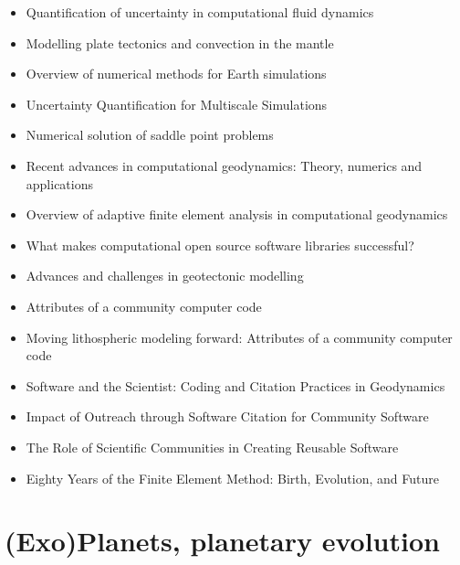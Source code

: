    \begin{itemize}
   \item [\nineteenninetyseven] Quantification of uncertainty in computational fluid dynamics \cite{roac97}
   \item [\twothousand] Modelling plate tectonics and convection in the mantle \cite{mogz00}
   \item [\twothousandone] Overview of numerical methods for Earth simulations \cite{momd01}
   \item [\twothousandtwo] Uncertainty Quantification for Multiscale Simulations \cite{degg02}
   \item [\twothousandfive] Numerical solution of saddle point problems \cite{begl05}
   \item [\twothousandeight] Recent advances in computational geodynamics: Theory, numerics and applications \cite{kags08}
   \item [\twothousandthirteen] Overview of adaptive finite element analysis in computational geodynamics \cite{masm13}
   \item [\twothousandthirteen] What makes computational open source software libraries successful? \cite{bahe13}
   \item [\twothousandfourteen] Advances and challenges in geotectonic modelling \cite{bufy14}
   \item [\twothousandfifteen] Attributes of a community computer code \cite{comc15}
   \item [\twothousandfifteen] Moving lithospheric modeling forward: Attributes of a community computer code \cite{comc15}
   \item [\twothousandseventeen] Software and the Scientist: Coding and Citation Practices in Geodynamics \cite{hwfs17}
   \item [\twothousandnineteen] Impact of Outreach through Software Citation for Community Software \cite{hwpc19}
   \item [\twothousandnineteen] The Role of Scientific Communities in Creating Reusable Software \cite{kehg19}
   \item [\twothousandtwentytwo] Eighty Years of the Finite Element Method: Birth, Evolution, and Future \cite{lilp22}
   \end{itemize}

\section{(Exo)Planets, planetary evolution}

